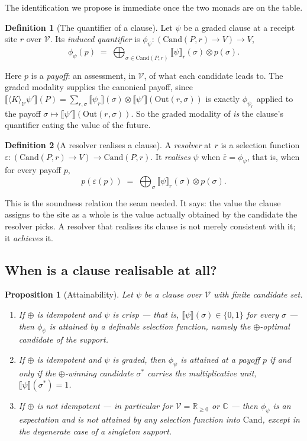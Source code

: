 \documentclass[11pt]{article}
\theoremstyle{definition}
\newtheorem{definition}{Definition}
\theoremstyle{plain}
\newtheorem{proposition}{Proposition}
\theoremstyle{remark}
\newcommand{\V}{\mathcal{V}}
\newcommand{\sumv}{\oplus}
\newcommand{\bigsumv}{\bigoplus}
\newcommand{\tensorv}{\otimes}
\newcommand{\Rnn}{\mathbb{R}_{\geq 0}}
\newcommand{\Cx}{\mathbb{C}}
\newcommand{\Cand}{\mathrm{Cand}}
\newcommand{\Out}{\mathrm{Out}}
\newcommand{\sem}[1]{\llbracket #1 \rrbracket}
\begin{document}
The identification we propose is immediate once the two monads are on the table.

\begin{definition}[The quantifier of a clause]\label{def:quant}
Let $\psi$ be a graded clause at a receipt site $r$ over $\V$. Its \emph{induced
quantifier} is $\phi_\psi : (\Cand(P,r) \to V) \to V$,
\[
  \phi_\psi(p) \;=\; \bigsumv_{\sigma \in \Cand(P,r)} \sem{\psi}_r(\sigma)
  \tensorv p(\sigma) .
\]
\end{definition}

\noindent
Here $p$ is a \emph{payoff}: an assessment, in $\V$, of what each candidate leads to.
The graded modality supplies the canonical payoff, since
$\sem{\langle K \rangle_\V \psi'}(P) = \sum_{r,\sigma} \sem{\psi_r}(\sigma) \tensorv
\sem{\psi'}(\Out(r,\sigma))$ is exactly $\phi_{\psi_r}$ applied to the payoff
$\sigma \mapsto \sem{\psi'}(\Out(r,\sigma))$. So the graded modality of
\cite{gradedwhere} \emph{is} the clause's quantifier eating the value of the future.

\begin{definition}[A resolver realises a clause]\label{def:realise}
A \emph{resolver} at $r$ is a selection function
$\varepsilon : (\Cand(P,r) \to V) \to \Cand(P,r)$. It \emph{realises} $\psi$ when
$\overline{\varepsilon} = \phi_\psi$, that is, when for every payoff $p$,
\[
  p(\varepsilon(p)) \;=\; \bigsumv_{\sigma} \sem{\psi}_r(\sigma) \tensorv p(\sigma).
\]
\end{definition}

This is the soundness relation the seam needed. It says: the value the clause assigns
to the site as a whole is the value actually obtained by the candidate the resolver
picks. A resolver that realises its clause is not merely consistent with it; it
\emph{achieves} it.

\subsection{When is a clause realisable at all?}

\begin{proposition}[Attainability]\label{prop:attain}
Let $\psi$ be a clause over $\V$ with finite candidate set.
\begin{enumerate}[label=(\roman*),leftmargin=2.2em,itemsep=2pt]
\item If $\sumv$ is idempotent and $\psi$ is crisp --- that is, $\sem{\psi}(\sigma) \in
\{0,1\}$ for every $\sigma$ --- then $\phi_\psi$ is attained by a definable selection
function, namely the $\sumv$-optimal candidate of the support.
\item If $\sumv$ is idempotent and $\psi$ is graded, then $\phi_\psi$ is attained at a
payoff $p$ if and only if the $\sumv$-winning candidate $\sigma^\ast$ carries the
multiplicative unit, $\sem{\psi}(\sigma^\ast) = 1$.
\item If $\sumv$ is not idempotent --- in particular for $\V = \Rnn$ or $\Cx$ --- then
$\phi_\psi$ is an expectation and is not attained by any selection function into
$\Cand$, except in the degenerate case of a singleton support.
\end{enumerate}
\end{proposition}
\end{document}
